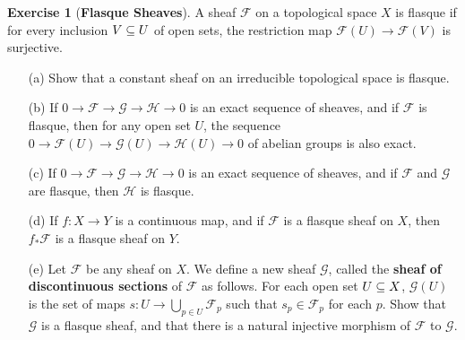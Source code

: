 \documentclass[11pt]{book}
\theoremstyle{definition}
\newtheorem{exercise}{Exercise}[section]
\begin{document}
\begin{exercise}[\textbf{Flasque Sheaves}]
A sheaf $\mathscr{F}$ on a topological space $X$ is flasque if for every inclusion $V\subseteq U$ of open sets, the restriction map $\mathscr{F}(U)\to\mathscr{F}(V)$ is surjective.
\begin{itemize}
\item[(a)] Show that a constant sheaf on an irreducible topological space is flasque.
\item[(b)] If $0\to\mathscr{F}\to\mathscr{G}\to\mathscr{H}\to 0$ is an exact sequence of sheaves, and if $\mathscr{F}$ is flasque, then for any open set $U$, the sequence $0\to\mathscr{F}(U)\to\mathscr{G}(U)\to\mathscr{H}(U)\to 0$ of abelian groups is also exact.
\item[(c)] If $0\to\mathscr{F}\to\mathscr{G}\to\mathscr{H}\to 0$ is an exact sequence of sheaves, and if $\mathscr{F}$ and $\mathscr{G}$ are flasque, then $\mathscr{H}$ is flasque.
\item[(d)] If $f:X\to Y$ is a continuous map, and if $\mathscr{F}$ is a flasque sheaf on $X$, then $f_*\mathscr{F}$ is a flasque sheaf on $Y$.
\item[(e)] Let $\mathscr{F}$ be any sheaf on $X$. We define a new sheaf $\mathscr{G}$, called the \textbf{sheaf of discontinuous sections} of $\mathscr{F}$ as follows. For each open set $U\subseteq X$, $\mathscr{G}(U)$ is the set of maps $s:U\to\bigcup_{p\in U}\mathscr{F}_p$ such that $s_p\in\mathscr{F}_p$ for each $p$. Show that $\mathscr{G}$ is a flasque sheaf, and that there is a natural injective morphism of $\mathscr{F}$ to $\mathscr{G}$.
\end{itemize}
\end{exercise}
\end{document}
